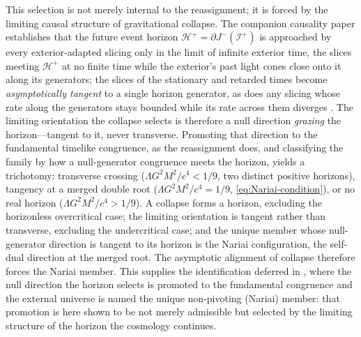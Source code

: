 \documentclass[11pt,a4paper]{article}
\theoremstyle{plain}
\theoremstyle{definition}
\theoremstyle{remark}
\begin{document}
This selection is not merely internal to the reassignment; it is forced by the limiting causal structure of gravitational collapse. The companion causality paper establishes that the future event horizon $\mathcal{H}^+=\partial J^-(\mathscr{I}^+)$ is approached by every exterior-adapted slicing only in the limit of infinite exterior time, the slices meeting $\mathcal{H}^+$ at no finite time while the exterior's past light cones close onto it along its generators; the slices of the stationary and retarded times become \emph{asymptotically tangent} to a single horizon generator, as does any slicing whose rate along the generators stays bounded while its rate across them diverges \cite{JanzenBHcausality}. The limiting orientation the collapse selects is therefore a null direction \emph{grazing} the horizon---tangent to it, never transverse. Promoting that direction to the fundamental timelike congruence, as the reassignment does, and classifying the family by how a null-generator congruence meets the horizon, yields a trichotomy: transverse crossing ($\Lambda G^2M^2/c^4<1/9$, two distinct positive horizons), tangency at a merged double root ($\Lambda G^2M^2/c^4=1/9$, \eqref{eq:Nariai-condition}), or no real horizon ($\Lambda G^2M^2/c^4>1/9$). A collapse forms a horizon, excluding the horizonless overcritical case; the limiting orientation is tangent rather than transverse, excluding the undercritical case; and the unique member whose null-generator direction is tangent to its horizon is the Nariai configuration, the self-dual direction at the merged root. The asymptotic alignment of collapse therefore forces the Nariai member. This supplies the identification deferred in \cite{JanzenBHcausality}, where the null direction the horizon selects is promoted to the fundamental congruence and the external universe is named the unique non-pivoting (Nariai) member: that promotion is here shown to be not merely admissible but selected by the limiting structure of the horizon the cosmology continues.
\end{document}
